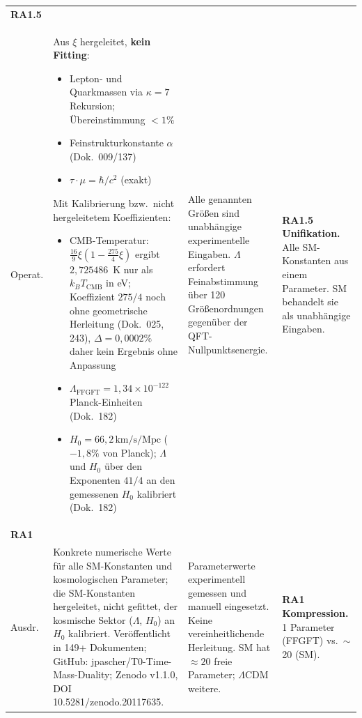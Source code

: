 {\begin{longtable}{p{2.0cm}p{4.4cm}p{4.4cm}p{2.55cm}}
\midrule

\textbf{RA1.5}\\Operat. &
Aus $\xi$ hergeleitet, \textbf{kein Fitting}:
{\small\begin{itemize}[leftmargin=*,nosep,itemsep=1pt]
  \item Lepton- und Quarkmassen via $\kappa=7$ Rekursion; Übereinstimmung $<1\%$
  \item Feinstrukturkonstante $\alpha$ (Dok.~009/137)
  \item $\tau\cdot\mu = \hbar/c^2$ (exakt)
\end{itemize}}
Mit Kalibrierung bzw.\ nicht hergeleitetem Koeffizienten:
{\small\begin{itemize}[leftmargin=*,nosep,itemsep=1pt]
  \item CMB-Temperatur: $\tfrac{16}{9}\xi(1-\tfrac{275}{4}\xi)$ ergibt $2{,}725486$~K nur als $k_BT_\text{CMB}$ in eV; Koeffizient $275/4$ noch ohne geometrische Herleitung (Dok.~025, 243), $\Delta = 0{,}0002\%$ daher kein Ergebnis ohne Anpassung
  \item $\Lambda_\text{FFGFT} = 1{,}34\times10^{-122}$ Planck-Einheiten (Dok.~182)
  \item $H_0 = 66{,}2\,\text{km/s/Mpc}$ ($-1{,}8\%$ von Planck); $\Lambda$ und $H_0$ über den Exponenten $41/4$ an den gemessenen $H_0$ kalibriert (Dok.~182)
\end{itemize}} &
Alle genannten Größen sind unabhängige experimentelle Eingaben. $\Lambda$ erfordert Feinabstimmung über 120 Größenordnungen gegenüber der QFT-Nullpunktsenergie. &
\textbf{RA1.5 Unifikation.} Alle SM-Konstanten aus einem Parameter. SM behandelt sie als unabhängige Eingaben. \\

\midrule

\textbf{RA1}\\Ausdr. &
Konkrete numerische Werte für alle SM-Konstanten und kosmologischen Parameter; die SM-Konstanten hergeleitet, nicht gefittet, der kosmische Sektor ($\Lambda$, $H_0$) an $H_0$ kalibriert. Veröffentlicht in 149+ Dokumenten; GitHub: jpascher/T0-Time-Mass-Duality; Zenodo v1.1.0, DOI 10.5281/zenodo.20117635. &
Parameterwerte experimentell gemessen und manuell eingesetzt. Keine vereinheitlichende Herleitung. SM hat $\approx\!20$ freie Parameter; $\Lambda$CDM weitere. &
\textbf{RA1 Kompression.} 1 Parameter (FFGFT) vs.\ $\sim$20 (SM). \\

\end{longtable}
}

